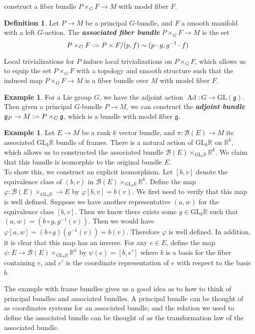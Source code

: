 \documentclass[psamsfonts, 12pt]{amsart}
\theoremstyle{definition}
\newtheorem{defn}[thm]{Definition}
\newtheorem{exmp}[thm]{Example}
\theoremstyle{remark}
\newcommand{\R}{\mathbb{R}}
\newcommand{\ib}[1]{\textbf{\textit{#1}}}
\newcommand{\GL}{\mathrm{GL}}
\newcommand{\g}{\mathfrak{g}}
\newcommand{\inv}{^{-1}}
\newcommand{\defeq}{\vcentcolon=}
\DeclareMathOperator{\Ad}{Ad}
\begin{document}
construct a fiber bundle $P\times_G F \to M$ with model fiber $F$.
%
\begin{defn}
Let $P \to M$ be a principal $G$-bundle, and $F$ a smooth manifold with a left $G$-action.
The \ib{associated fiber bundle} $P\times_G F \to M$ is the set
\[
P \times_G F \defeq P \times F / (p,f) \sim (p\cdot g, g\inv\cdot f)
\]
\end{defn}
%
Local trivializations for $P$ induce local trivializations on $P \times_G F$, which
allows us to equip the set $P \times_G F$ with a topology and smooth structure such
that the induced map $P\times_G F \to M$ is a fiber bundle over $M$ with model fiber $F$.
%
\begin{exmp}
For a Lie group $G$, we have the adjoint action $\Ad : G \to \GL(\g)$. Then given
a principal $G$-bundle $P \to M$, we can construct the \ib{adjoint bundle}
$\g_P \to M \defeq P \times_G \g$, which is a bundle with model fiber $\g$.
\end{exmp}
%
\begin{exmp}
Let $E \to M$ be a rank $k$ vector bundle, and $\pi : \mathcal{B}(E) \to M$ its associated
$\GL_k\R$ bundle of frames. There is a natural action of $\GL_k\R$ on $\R^k$, which
allows us to constructed the associated bundle $\mathcal{B}(E) \times_{\GL_k\R} \R^k$.
We claim that this bundle is isomorphic to the original bundle $E$. \\

To show this, we construct an explicit isomorphism. Let $[b,v]$ denote the equivalence
class of $(b,v)$ in $\mathcal{B}(E) \times_{\GL_k\R} \R^k$. Define the map
$\varphi : \mathcal{B}(E) \times_{\GL_k\R} \to E$ by $\varphi[b,v] = b(v)$.
We first need to verify that this map is well defined. Suppose we have another
representative $(a,w)$ for the equivalence class $[b,v]$. Then we know there
exists some $g \in \GL_k\R$ such that $(a,w) = (b \circ g, g\inv(v))$. Then we would
have $\varphi[a,w] = (b \circ g)(g\inv(v)) = b(v)$. Therefore $\varphi$ is well defined.
In addition, it is clear that this map has an inverse. For any $e \in E$, define
the map $\psi : E \to \mathcal{B}(E) \times_{\GL_k\R} \R^k$ by
$\psi(e) = [b, e']$ where $b$ is a basis for the fiber containing $e$, and $e'$ is
the coordinate representation of $e$ with respect to the basis $b$.
\end{exmp}
%
The example with frame bundles gives us a good idea as to how to think of
principal bundles and associated bundles. A principal bundle can be thought of as
coordinates systems for an associated bundle, and the relation we used to define
the associated bundle can be thought of as the transformation law of the associated
bundle. \\
\end{document}
